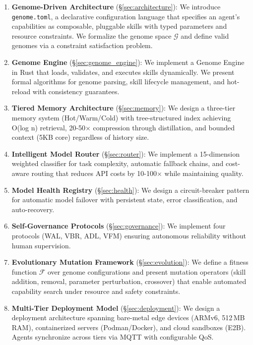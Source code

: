 \documentclass{article}
\newcommand{\genome}{\texttt{genome.toml}}
\newcommand{\fitnessfn}{\mathcal{F}}
\newcommand{\genomespace}{\mathcal{G}}
\begin{document}
\begin{enumerate}[leftmargin=*]
    \item \textbf{Genome-Driven Architecture} (\S\ref{sec:architecture}): We introduce \genome{}, a declarative configuration language that specifies an agent's capabilities as composable, pluggable skills with typed parameters and resource constraints. We formalize the genome space $\genomespace$ and define valid genomes via a constraint satisfaction problem.
    
    \item \textbf{Genome Engine} (\S\ref{sec:genome_engine}): We implement a Genome Engine in Rust that loads, validates, and executes skills dynamically. We present formal algorithms for genome parsing, skill lifecycle management, and hot-reload with consistency guarantees.
    
    \item \textbf{Tiered Memory Architecture} (\S\ref{sec:memory}): We design a three-tier memory system (Hot/Warm/Cold) with tree-structured index achieving O(log n) retrieval, 20-50$\times$ compression through distillation, and bounded context (5KB core) regardless of history size.
    
    \item \textbf{Intelligent Model Router} (\S\ref{sec:router}): We implement a 15-dimension weighted classifier for task complexity, automatic fallback chains, and cost-aware routing that reduces API costs by 10-100$\times$ while maintaining quality.
    
    \item \textbf{Model Health Registry} (\S\ref{sec:health}): We design a circuit-breaker pattern for automatic model failover with persistent state, error classification, and auto-recovery.
    
    \item \textbf{Self-Governance Protocols} (\S\ref{sec:governance}): We implement four protocols (WAL, VBR, ADL, VFM) ensuring autonomous reliability without human supervision.
    
    \item \textbf{Evolutionary Mutation Framework} (\S\ref{sec:evolution}): We define a fitness function $\fitnessfn$ over genome configurations and present mutation operators (skill addition, removal, parameter perturbation, crossover) that enable automated capability search under resource and safety constraints.
    
    \item \textbf{Multi-Tier Deployment Model} (\S\ref{sec:deployment}): We design a deployment architecture spanning bare-metal edge devices (ARMv6, 512\,MB RAM), containerized servers (Podman/Docker), and cloud sandboxes (E2B). Agents synchronize across tiers via MQTT with configurable QoS.
    

\end{enumerate}
\end{document}
